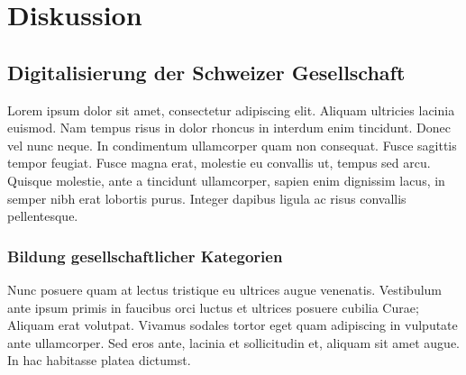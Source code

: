 


\chapter{Diskussion} %

\label{Chapter6} %


\section{Digitalisierung der Schweizer Gesellschaft}

Lorem ipsum dolor sit amet, consectetur adipiscing elit. Aliquam ultricies lacinia euismod. Nam tempus risus in dolor rhoncus in interdum enim tincidunt. Donec vel nunc neque. In condimentum ullamcorper quam non consequat. Fusce sagittis tempor feugiat. Fusce magna erat, molestie eu convallis ut, tempus sed arcu. Quisque molestie, ante a tincidunt ullamcorper, sapien enim dignissim lacus, in semper nibh erat lobortis purus. Integer dapibus ligula ac risus convallis pellentesque.

\subsection{Bildung gesellschaftlicher Kategorien}

Nunc posuere quam at lectus tristique eu ultrices augue venenatis. Vestibulum ante ipsum primis in faucibus orci luctus et ultrices posuere cubilia Curae; Aliquam erat volutpat. Vivamus sodales tortor eget quam adipiscing in vulputate ante ullamcorper. Sed eros ante, lacinia et sollicitudin et, aliquam sit amet augue. In hac habitasse platea dictumst.


